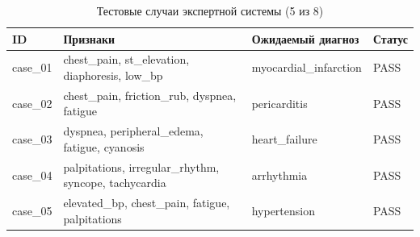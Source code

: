 \begin{table}[H]
\centering
\caption{Тестовые случаи экспертной системы (5 из 8)}
\label{tab:cases}
\begin{tabular}{p{2.0cm}p{5.0cm}p{4.5cm}p{1.5cm}}
\toprule
ID & Признаки & Ожидаемый диагноз & Статус \\
\midrule
case\_01 & chest\_pain, st\_elevation, diaphoresis, low\_bp & myocardial\_infarction & PASS \\
case\_02 & chest\_pain, friction\_rub, dyspnea, fatigue & pericarditis & PASS \\
case\_03 & dyspnea, peripheral\_edema, fatigue, cyanosis & heart\_failure & PASS \\
case\_04 & palpitations, irregular\_rhythm, syncope, tachycardia & arrhythmia & PASS \\
case\_05 & elevated\_bp, chest\_pain, fatigue, palpitations & hypertension & PASS \\
\bottomrule
\end{tabular}
\end{table}